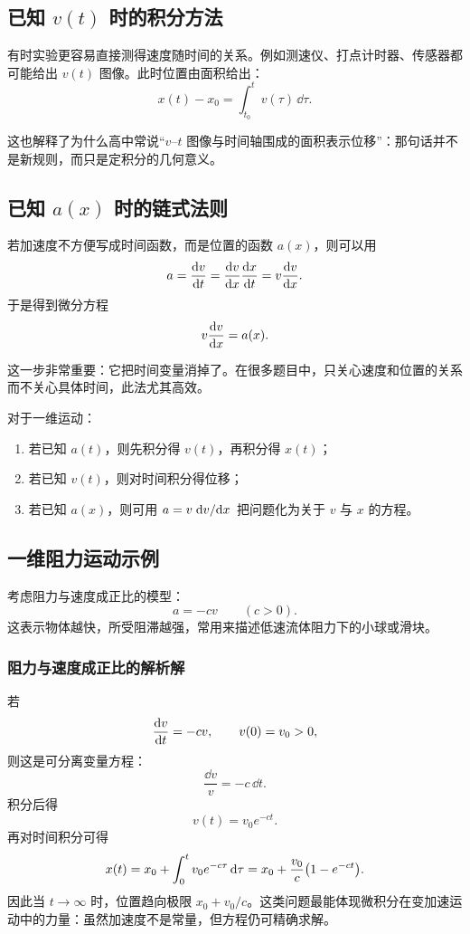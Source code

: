 \subsection{已知 $v(t)$ 时的积分方法}

有时实验更容易直接测得速度随时间的关系。例如测速仪、打点计时器、传感器都可能给出 $v(t)$ 图像。此时位置由面积给出：
\[
 x(t)-x_0=\int_{t_0}^{t} v(\tau)\,\dd \tau.
\]

这也解释了为什么高中常说``$v$--$t$ 图像与时间轴围成的面积表示位移''：那句话并不是新规则，而只是定积分的几何意义。

\subsection{已知 $a(x)$ 时的链式法则}

若加速度不方便写成时间函数，而是位置的函数 $a(x)$，则可以用
\[
 a=\dv{v}{t}=\dv{v}{x}\dv{x}{t}=v\dv{v}{x}.
\]
于是得到微分方程
\[
 v\dv{v}{x}=a(x).
\]

这一步非常重要：它把时间变量消掉了。在很多题目中，只关心速度和位置的关系而不关心具体时间，此法尤其高效。

\begin{theorem}[变加速运动的三种基本求解路径]
对于一维运动：
\begin{enumerate}
  \item 若已知 $a(t)$，则先积分得 $v(t)$，再积分得 $x(t)$；
  \item 若已知 $v(t)$，则对时间积分得位移；
  \item 若已知 $a(x)$，则可用 $a=v\dv*{v}{x}$ 把问题化为关于 $v$ 与 $x$ 的方程。
\end{enumerate}
\end{theorem}

\subsection{一维阻力运动示例}

考虑阻力与速度成正比的模型：
\[
 a=-cv \qquad (c>0).
\]
这表示物体越快，所受阻滞越强，常用来描述低速流体阻力下的小球或滑块。

\subsubsection*{阻力与速度成正比的解析解}
若
\[
\dv{v}{t}=-cv,
\qquad v(0)=v_0>0,
\]
则这是可分离变量方程：
\[
\frac{\dd v}{v}=-c\,\dd t.
\]
积分后得
\[
 v(t)=v_0 e^{-ct}.
\]
再对时间积分可得
\[
 x(t)=x_0+\int_0^t v_0 e^{-c\tau}\,\dd \tau
      =x_0+\frac{v_0}{c}\qty(1-e^{-ct}).
\]
因此当 $t\to\infty$ 时，位置趋向极限 $x_0+v_0/c$。这类问题最能体现微积分在变加速运动中的力量：虽然加速度不是常量，但方程仍可精确求解。

